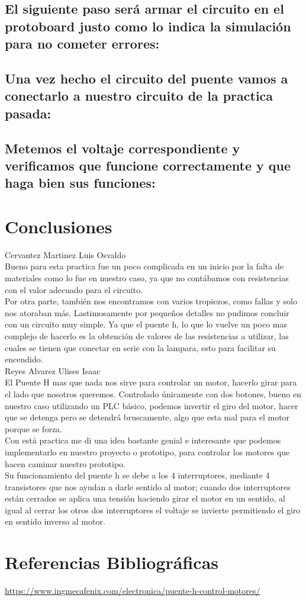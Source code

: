 \documentclass[12pt,a4paper]{article}
\begin{document}
\subsection{El siguiente paso será armar el circuito en el protoboard justo como lo indica la simulación para no cometer errores:}


\subsection{Una vez hecho el circuito del puente vamos a conectarlo a nuestro circuito de la practica pasada:}


\subsection{Metemos el voltaje correspondiente y verificamos que funcione correctamente y que haga bien sus funciones:}

\newpage
\section{Conclusiones}
Cervantez Martinez Luis Osvaldo\\
Bueno para esta practica fue un poco complicada en un inicio por la falta de materiales como lo fue en nuestro caso, ya que no contábamos con resistencias con el valor adecuado para el circuito.\\
Por otra parte, también nos encontramos con varios tropiezos, como fallas y solo nos atoraban más. Lastimosamente por pequeños detalles no pudimos concluir con un circuito muy simple. Ya que el puente h, lo que lo vuelve un poco mas complejo de hacerlo es la obtención de valores de las resistencias a utilizar, las cuales se tienen que conectar en serie con la lampara, esto para facilitar su encendido.\\


Reyes Alvarez Ulises Isaac\\
El Puente H mas que nada nos sirve para controlar un motor, hacerlo girar para el lado que nosotros queremos. Controlado únicamente con dos botones, bueno en nuestro caso utilizando un PLC básico, podemos invertir el giro del motor, hacer que se detenga pero se detendrá bruscamente, algo que esta mal para el motor porque se forza.\\
Con está practica me di una idea bastante genial e interesante que podemos implementarlo en nuestro proyecto o prototipo, para controlar los motores que hacen caminar nuestro prototipo.\\
Su funcionamiento del puente h se debe a los 4 interruptores, mediante 4 transistores que nos ayudan a darle sentido al motor; cuando dos interruptores están cerrados se aplica una tensión haciendo girar el motor en un sentido, al igual al cerrar los otros dos interruptores el voltaje se invierte permitiendo el giro en sentido inverso al motor. 

\newpage
\section{Referencias Bibliográficas}
\url{https://www.ingmecafenix.com/electronica/puente-h-control-motores/}
\end{document}
